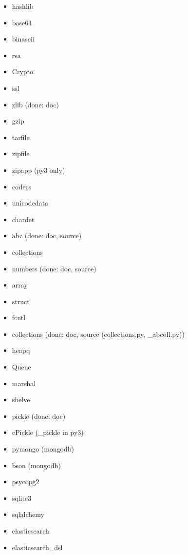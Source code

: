 \documentclass{article}
\begin{document}
\begin{enumerate}
\begin{itemize}
            \item hashlib
            \item base64
            \item binascii
            \item rsa

            \item Crypto
            \item ssl

            \item zlib (done: doc)
            \item gzip
            \item tarfile
            \item zipfile
            \item zipapp (py3 only)

            \item codecs
            \item unicodedata
            \item chardet

            \item abc (done: doc, source)
            \item collections
            \item numbers (done: doc, source)

            \item array
            \item struct
            \item fcntl

            \item collections (done: doc, source (collections.py, _abcoll.py))
            \item heapq
            \item Queue

            \item marshal
            \item shelve
            \item pickle (done: doc)
            \item cPickle (_pickle in py3)
            \item pymongo (mongodb)
            \item bson (mongodb)
            \item psycopg2
            \item sqlite3
            \item sqlalchemy
            \item elasticsearch
            \item elasticsearch_dsl


\end{itemize}
\end{enumerate}
\end{document}
